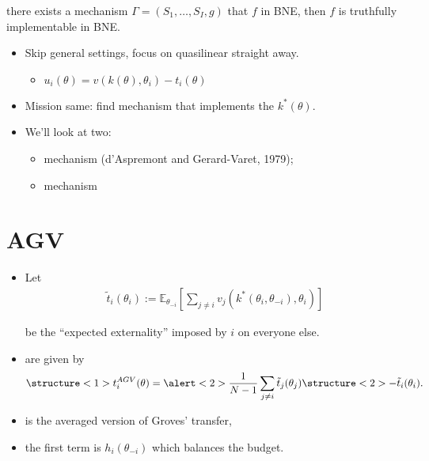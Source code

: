 \documentclass[english,handout]{beamer}		%
\def\lyxframeend{} %
\begin{document}
\begin{theorem}
	 there exists a mechanism $\Gamma=(S_{1},\dots,S_{I},g)$ that  $f$ in BNE, 
	\alert{then} $f$ is \alert{truthfully implementable} in BNE.
\end{theorem}
\lyxframeend


\begin{itemize}
	\item Skip general settings, focus on \alert{quasilinear} straight away.
	\begin{itemize}
		\item $u_i(\theta) = v(k(\theta),\theta_i) - t_i(\theta)$
	\end{itemize}
	\item Mission same: find mechanism that implements the  $k^*(\theta)$.
	\pause
	\item We'll look at two:
	\begin{itemize}
		\item {} mechanism (d'Aspremont and Gerard-Varet, 1979);
		\item {} mechanism
	\end{itemize}
\end{itemize}
\lyxframeend


\section{AGV}

\begin{itemize}
	\item Let 
	\vspace{-0.5em}\begin{align*}
	\tilde{t}_i (\theta_i) := \mathbb{E}_{\theta_{-i}} \left[ \sum_{j \neq i} v_j (k^*(\theta_i,\theta_{-i}), \theta_i) \right]
	\end{align*}\vspace{-1em}
	
	be the ``expected externality'' imposed by $i$ on everyone else.
	\item {} are given by
	\vspace{-0.5em}\begin{align*}
	\structure<1>{t_i^{AGV} (\theta) = \alert<2>{\frac{1}{N-1} \sum_{j \neq i} \tilde{t}_j (\theta_j)} \structure<2>{- \tilde{t}_i (\theta_i)}}.
	\end{align*}\vspace{-1em}
	\pause
	\item {} is the averaged version of Groves' transfer,
	\item \alert{the first term} is $h_i(\theta_{-i})$ which balances the budget.
\end{itemize}
\lyxframeend
\end{document}

